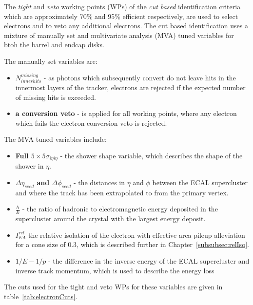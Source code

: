 The \emph{tight} and \emph{veto} working points (WPs) of the \emph{cut based} identification criteria which are approximately  70\% and 95\% efficient respectively, are used to select electrons and to veto any additional electrons.
The cut based identification uses a mixture of manually set and multivariate analysis (MVA) tuned variables for btoh the barrel and endcap disks.

The manually set variables are:
\begin{itemize}
\item \textbf{$N^{missing}_{inner hits}$} - as photons which subsequently convert do not leave hits in the innermost layers of the tracker, electrons are rejected if the expected number of missing hits is exceeded.
\item \textbf{a conversion veto} - is applied for all working points, where any electron which fails the electron conversion veto is rejected.
\end{itemize}

The MVA tuned variables include:
\begin{itemize}
\item \textbf{Full $5 \times 5 \sigma_{i\eta i\eta}$} - the shower shape variable, which describes the shape of the shower in $\eta$.
\item \textbf{$\Delta \eta_{seed}$ and $\Delta \phi_{seed}$} - the distances in $\eta$ and $\phi$ between the ECAL supercluster and where the track has been extrapolated to from the primary vertex.
\item \textbf{$\frac{h}{E}$} - the ratio of hadronic to electromagnetic energy deposited in the supercluster around the crystal with the largest energy deposit.
\item \textbf{$I^{rel}_{EA}$} the relative isolation of the electron with effective area pileup alleviation for a cone size of 0.3, which is described further in Chapter~\ref{subsubsec:relIso}.
\item \textbf{$1/E - 1/p$} - the difference in the inverse energy of the ECAL supercluster and inverse track momentum, which is used to describe the energy loss 
\end{itemize}

The cuts used for the tight and veto WPs for these variables are given in table~\ref{tab:electronCuts}.

